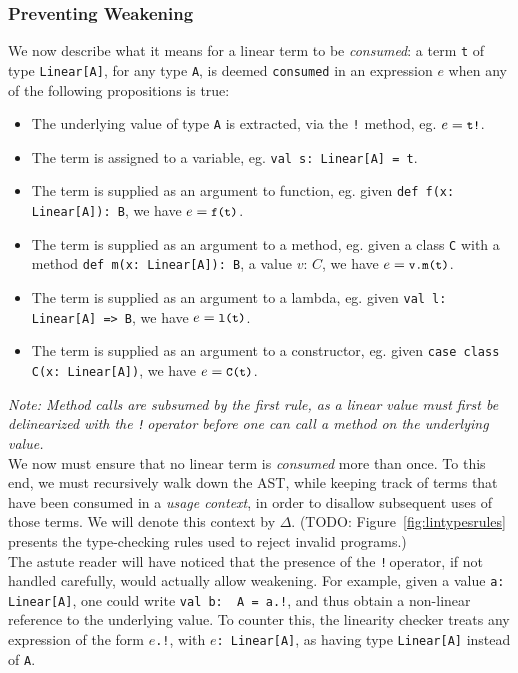 \documentclass[a4paper,twoside]{article}
\newcommand{\TODO}[1]{\textcolor{YellowOrange}{(TODO: #1)}} %
\newcommand{\RefFig}[1]{Figure~\ref{#1}}
\newcommand{\stt}[1]{\texttt{\small{#1}}}
\begin{document}
\subsubsection{Preventing Weakening}

We now describe what it means for a linear term to be \textit{consumed}: a term \stt{t} of type \stt{Linear[A]}, for any type \stt{A}, is deemed \stt{consumed} in an expression $e$ when any of the following propositions is true:

\begin{itemize}
\item The underlying value of type \stt{A} is extracted, via the \stt{!} method, eg. $e = \stt{t!}$.
\item The term is assigned to a variable, eg. \stt{val s:\,Linear[A] = t}.
\item The term is supplied as an argument to function, eg. given \stt{def f(x:\,Linear[A]):\,B}, we have $e = \stt{f(t)}$.
\item The term is supplied as an argument to a method, eg. given a class \stt{C} with a method \stt{def m(x:\,Linear[A]):\,B}, a value $v:\, C$, we have $e = \stt{v.m(t)}$.
\item The term is supplied as an argument to a lambda, eg. given \stt{val l:\,Linear[A] => B}, we have $e = \stt{l(t)}$.
\item The term is supplied as an argument to a constructor, eg. given \stt{case class C(x: Linear[A])}, we have $e = \stt{C(t)}$.
\end{itemize}

\textit{Note: Method calls are subsumed by the first rule, as a linear value must first be delinearized with the \stt{!}\,operator before one can call a method on the underlying value.}\\

We now must ensure that no linear term is \textit{consumed} more than once. To this end, we must recursively walk down the AST, while keeping track of terms that have been consumed in a \textit{usage context}, in order to disallow subsequent uses of those terms. We will denote this context by $\Delta$. \TODO{\RefFig{fig:lintypesrules} presents the type-checking rules used to reject invalid programs.}\\

The astute reader will have noticed that the presence of the \stt{!}\,operator, if not handled carefully, would actually allow weakening. For example, given a value \stt{a:\,Linear[A]}, one could write \stt{val b:\, A = a.!}, and thus obtain a non-linear reference to the underlying value. To counter this, the linearity checker treats any expression of the form \stt{$e$.!}, with \stt{$e$:\,Linear[A]}, as having type \stt{Linear[A]} instead of \stt{A}.
\end{document}
